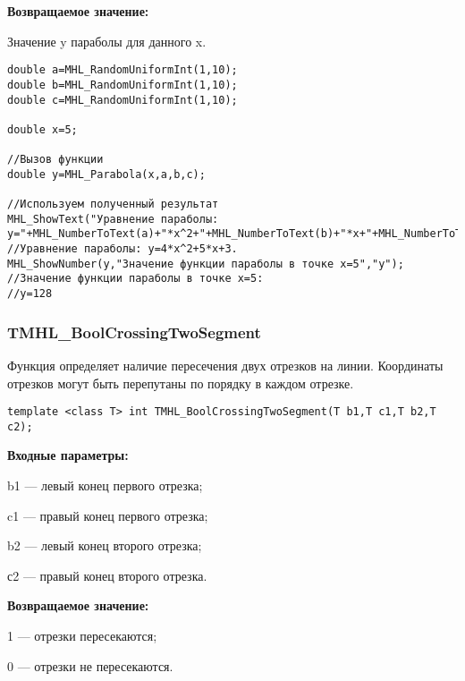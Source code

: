 \documentclass[a4paper,12pt]{article}
\begin{document}
\textbf{Возвращаемое значение:}

Значение y параболы для данного x.


\begin{lstlisting}[label=code_use_MHL_Parabola,caption=Пример использования]
double a=MHL_RandomUniformInt(1,10);
double b=MHL_RandomUniformInt(1,10);
double c=MHL_RandomUniformInt(1,10);

double x=5;

//Вызов функции
double y=MHL_Parabola(x,a,b,c);

//Используем полученный результат
MHL_ShowText("Уравнение параболы: y="+MHL_NumberToText(a)+"*x^2+"+MHL_NumberToText(b)+"*x+"+MHL_NumberToText(c));
//Уравнение параболы: y=4*x^2+5*x+3.
MHL_ShowNumber(y,"Значение функции параболы в точке x=5","y");
//Значение функции параболы в точке x=5:
//y=128
\end{lstlisting}

\subsubsection{TMHL\_BoolCrossingTwoSegment}\label{TMHL_BoolCrossingTwoSegment}

Функция определяет наличие пересечения двух отрезков на линии. Координаты отрезков могут быть перепутаны по порядку в каждом отрезке.


\begin{lstlisting}[label=code_syntax_TMHL_BoolCrossingTwoSegment,caption=Синтаксис]
template <class T> int TMHL_BoolCrossingTwoSegment(T b1,T c1,T b2,T c2);
\end{lstlisting}

\textbf{Входные параметры:}  
 
b1 --- левый конец первого отрезка;
 
c1 --- правый конец первого отрезка;
 
b2 --- левый конец второго отрезка;
 
с2 --- правый конец второго отрезка.

\textbf{Возвращаемое значение:}
 
1 --- отрезки пересекаются;
 
0 --- отрезки не пересекаются.
\end{document}
